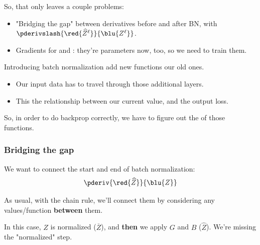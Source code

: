             So, that only leaves a couple problems:

            \begin{itemize}
                \item "Bridging the gap" between derivatives before and after BN, with $\pderivslash{\red{\widehat{Z}^\ell}}{\blu{Z^\ell}}$.
                
                \item Gradients for  and : they're parameters now, too, so we need to train them.\\
                
            \end{itemize}

            \begin{concept}
                Introducing batch normalization add new functions  our old ones. 

                \begin{itemize}
                    \item Our input data has to travel through those additional layers.
                    \item This  the relationship between our current value, and the output loss.
                \end{itemize}

                So, in order to do backprop correctly, we have to figure out the  of those functions.
            \end{concept}


        \subsubsection{Bridging the gap}

            We want to connect the start and end of batch normalization:\\

            \begin{equation}
                \pderiv{\red{\widehat{Z}}}{\blu{Z}}
            \end{equation}

            As usual, with the chain rule, we'll connect them by considering any values/function \textbf{between} them.

            In this case, $Z$ is normalized ($\overline{Z}$), and \textbf{then} we apply $G$ and $B$ ($\widehat{Z}$). We're missing the "normalized" step.

